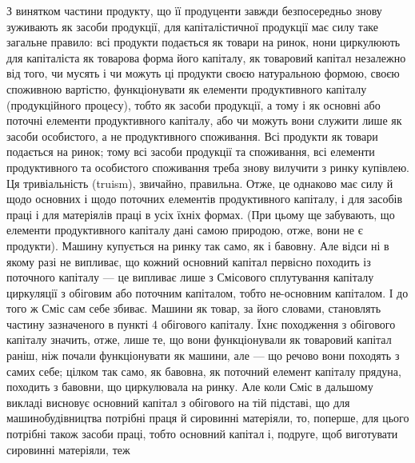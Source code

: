 З винятком частини продукту, що її продуценти завжди безпосередньо
знову зуживають як засоби продукції, для капіталістичної продукції
має силу таке загальне правило: всі продукти подається як товари на ринок,
нони циркулюють для капіталіста як товарова форма його капіталу, як товаровий
капітал незалежно від того, чи мусять і чи можуть ці продукти
своєю натуральною формою, своєю споживною вартістю, функціонувати як
елементи продуктивного капіталу (продукційного процесу), тобто як засоби
продукції, а тому і як основні або поточні елементи продуктивного капіталу,
або чи можуть вони служити лише як засоби особистого, а не продуктивного
споживання. Всі продукти як товари подається на ринок;
тому всі засоби продукції та споживання, всі елементи продуктивного та
особистого споживання треба знову вилучити з ринку купівлею. Ця тривіальність
(truism), звичайно, правильна. Отже, це однаково має силу й
щодо основних і щодо поточних елементів продуктивного капіталу, і
для засобів праці і для матеріялів праці в усіх їхніх формах. (При цьому
ще забувають, що елементи продуктивного капіталу дані самою природою,
отже, вони не є продукти). Машину купується на ринку так само,
як і бавовну. Але відси ні в якому разі не випливає, що кожний основний
капітал первісно походить із поточного капіталу — це випливає лише
з Смісового сплутування капіталу циркуляції з обіговим або поточним
капіталом, тобто не-основним капіталом. І до того ж Сміс сам себе збиває.
Машини як товар, за його словами, становлять частину зазначеного
в пункті 4 обігового капіталу. Їхнє походження з обігового капіталу значить,
отже, лише те, що вони функціонували як товаровий капітал раніш,
ніж почали функціонувати як машини, але — що речово вони походять
з самих себе; цілком так само, як бавовна, як поточний елемент капіталу
прядуна, походить з бавовни, що циркулювала на ринку. Але коли
Сміс в дальшому викладі висновує основний капітал з обігового на
тій підставі, що для машинобудівництва потрібні праця й сировинні матеріяли,
то, поперше, для цього потрібні також засоби праці, тобто основний
капітал і, подруге, щоб виготувати сировинні матеріяли, теж
\parbreak{}  %
